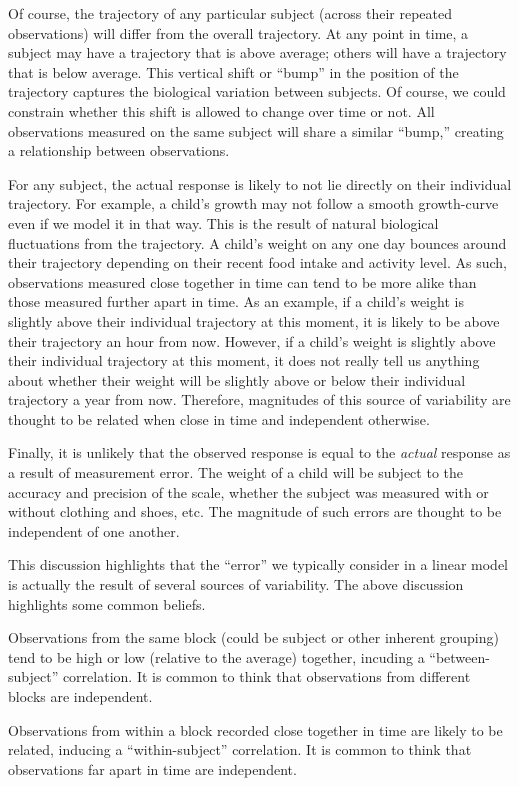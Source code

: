 \documentclass[
]{book}
\theoremstyle{plain}
\theoremstyle{mydefn}
\theoremstyle{myexmpl}
\theoremstyle{remark}
\begin{document}
Of course, the trajectory of any particular subject (across their repeated observations) will differ from the overall trajectory. At any point in time, a subject may have a trajectory that is above average; others will have a trajectory that is below average. This vertical shift or ``bump'' in the position of the trajectory captures the biological variation between subjects. Of course, we could constrain whether this shift is allowed to change over time or not. All observations measured on the same subject will share a similar ``bump,'' creating a relationship between observations.

For any subject, the actual response is likely to not lie directly on their individual trajectory. For example, a child's growth may not follow a smooth growth-curve even if we model it in that way. This is the result of natural biological fluctuations from the trajectory. A child's weight on any one day bounces around their trajectory depending on their recent food intake and activity level. As such, observations measured close together in time can tend to be more alike than those measured further apart in time. As an example, if a child's weight is slightly above their individual trajectory at this moment, it is likely to be above their trajectory an hour from now. However, if a child's weight is slightly above their individual trajectory at this moment, it does not really tell us anything about whether their weight will be slightly above or below their individual trajectory a year from now. Therefore, magnitudes of this source of variability are thought to be related when close in time and independent otherwise.

Finally, it is unlikely that the observed response is equal to the \emph{actual} response as a result of measurement error. The weight of a child will be subject to the accuracy and precision of the scale, whether the subject was measured with or without clothing and shoes, etc. The magnitude of such errors are thought to be independent of one another.

This discussion highlights that the ``error'' we typically consider in a linear model is actually the result of several sources of variability. The above discussion highlights some common beliefs.

\begin{rmdkeyidea}
Observations from the same block (could be subject or other inherent grouping) tend to be high or low (relative to the average) together, incuding a ``between-subject'' correlation. It is common to think that observations from different blocks are independent.

Observations from within a block recorded close together in time are likely to be related, inducing a ``within-subject'' correlation. It is common to think that observations far apart in time are independent.
\end{rmdkeyidea}
\end{document}

